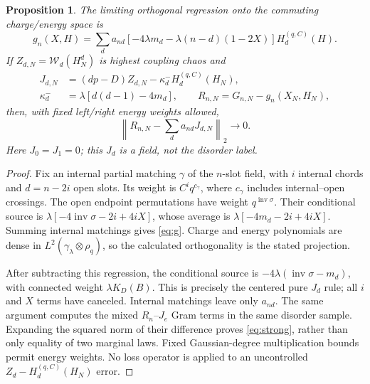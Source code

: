\documentclass[11pt]{article}
\newcommand{\HH}{H^{(q,C)}}
\newcommand{\WW}{\mathcal W}
\newtheorem{proposition}{Proposition}
\begin{document}
\begin{proposition}
The limiting orthogonal regression onto the commuting charge/energy
space is
\begin{equation}
 \boxed{g_n(X,H)=\sum_d a_{nd}
 [-4\lambda m_d-\lambda(n-d)(1-2X)]\HH_d(H).}\label{eq:g}
\end{equation}
If $Z_{d,N}=\WW_d(H_N^d)$ is highest coupling chaos and
\begin{align}
 J_{d,N}&=(dp-D)Z_{d,N}-\kappa_d^-\HH_d(H_N),\\
 \kappa_d^-&=\lambda[d(d-1)-4m_d],\qquad
 R_{n,N}=G_{n,N}-g_n(X_N,H_N),
\end{align}
then, with fixed left/right energy weights allowed,
\begin{equation}
 \left\|R_{n,N}-\sum_d a_{nd}J_{d,N}\right\|_2\longrightarrow0.
 \label{eq:strong}
\end{equation}
Here $J_0=J_1=0$; this $J_d$ is a field, not the disorder label.
\end{proposition}
\begin{proof}
Fix an internal partial matching $\gamma$ of the $n$-slot field,
with $i$ internal chords and $d=n-2i$ open slots. Its weight is
$C^i q^{c_\gamma}$, where $c_\gamma$ includes internal--open crossings.
The open endpoint permutations have weight $q^{\operatorname{inv}\sigma}$.
Their conditional source is $\lambda[-4\operatorname{inv}\sigma-2i+4iX]$,
whose average is $\lambda[-4m_d-2i+4iX]$.
Summing internal matchings gives \eqref{eq:g}. Charge and energy
polynomials are dense in $L^2(\gamma_\lambda\otimes\rho_q)$,
so the calculated orthogonality is the stated projection.

After subtracting this regression, the conditional source is
$-4\lambda(\operatorname{inv}\sigma-m_d)$, with connected weight
$\lambda K_D(B)$. This is precisely the centered pure $J_d$ rule;
all $i$ and $X$ terms have canceled. Internal matchings leave only
$a_{nd}$. The same argument computes the mixed $R_n$--$J_e$ Gram
terms in the same disorder sample. Expanding the squared norm of
their difference proves \eqref{eq:strong}, rather than only equality
of two marginal laws. Fixed Gaussian-degree multiplication bounds
permit energy weights. No loss operator is applied to an uncontrolled
$Z_d-\HH_d(H_N)$ error.
\end{proof}

\newpage
\end{document}
